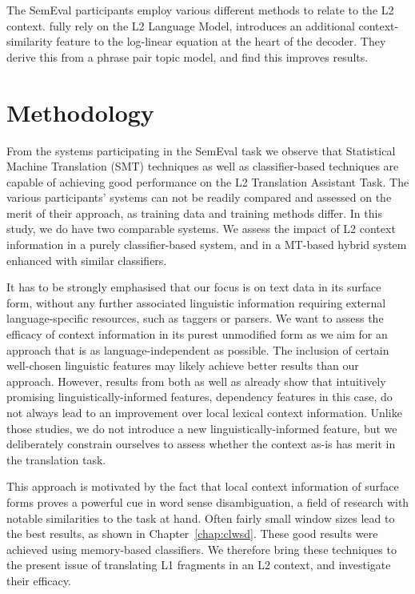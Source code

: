 The SemEval participants employ various different methods to relate to
the L2 context. \cite{CNRC} fully rely on the L2 Language Model,
\cite{UEDIN} introduces an additional context-similarity feature to
the log-linear equation at the heart of the decoder. They derive this
from a phrase pair topic model, and find this improves results.


\section{Methodology}
\label{methodology}

From the systems participating in the SemEval task we observe that Statistical
Machine Translation (SMT) techniques as well as classifier-based techniques are
capable of achieving good performance on the L2 Translation Assistant Task. The
various participants' systems can not be readily compared and assessed on the
merit of their approach, as training data and training methods differ. In this
study, we do have two comparable systems. We assess the impact of L2 context
information in a purely classifier-based system, and in a MT-based hybrid system
enhanced with similar classifiers.

It has to be strongly emphasised that our focus is on text data in its surface form,
without any further associated linguistic information requiring external
language-specific resources, such as taggers or parsers. We want to assess the
efficacy of context information in its purest unmodified form as we aim for an
approach that is as language-independent as possible. The inclusion of certain
well-chosen linguistic features may likely achieve better results than our
approach. However, results from both \cite{UNAL} as well as \cite{IUCL} already
show that intuitively promising linguistically-informed features, dependency
features in this case, do not always lead to an improvement over local lexical
context information. Unlike those studies, we do not introduce a new
linguistically-informed feature, but we deliberately constrain ourselves to
assess whether the context as-is has merit in the translation task.

This approach is motivated by the fact that local context information of
surface forms proves a powerful cue in word sense disambiguation, a field of
research with notable similarities to the task at hand. Often fairly small
window sizes lead to the best results, as shown in Chapter~\ref{chap:clwsd}.
These good results were achieved using memory-based classifiers. We therefore
bring these techniques to the present issue of translating L1 fragments in an
L2 context, and investigate their efficacy.

